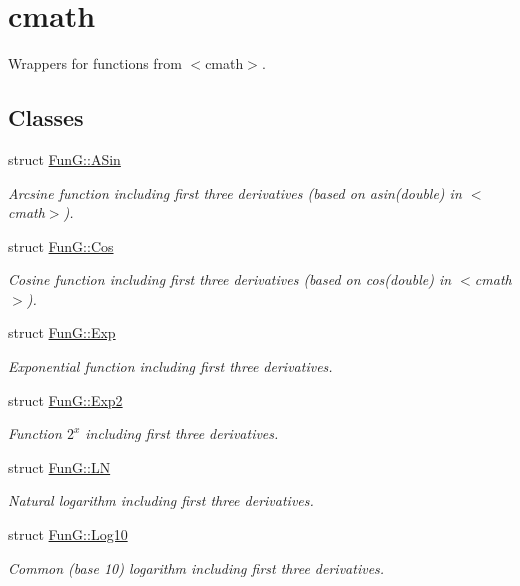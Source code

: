 \hypertarget{group__CMathGroup}{\section{cmath}
\label{group__CMathGroup}
}


Wrappers for functions from $<$cmath$>$.  


\subsection*{Classes}
\begin{DoxyCompactItemize}
\item 
struct \hyperlink{structFunG_1_1ASin}{Fun\-G\-::\-A\-Sin}
\begin{DoxyCompactList}\small\item\em Arcsine function including first three derivatives (based on asin(double) in $<$cmath$>$). \end{DoxyCompactList}\item 
struct \hyperlink{structFunG_1_1Cos}{Fun\-G\-::\-Cos}
\begin{DoxyCompactList}\small\item\em Cosine function including first three derivatives (based on cos(double) in $<$cmath$>$). \end{DoxyCompactList}\item 
struct \hyperlink{structFunG_1_1Exp}{Fun\-G\-::\-Exp}
\begin{DoxyCompactList}\small\item\em Exponential function including first three derivatives. \end{DoxyCompactList}\item 
struct \hyperlink{structFunG_1_1Exp2}{Fun\-G\-::\-Exp2}
\begin{DoxyCompactList}\small\item\em Function $2^x$ including first three derivatives. \end{DoxyCompactList}\item 
struct \hyperlink{structFunG_1_1LN}{Fun\-G\-::\-L\-N}
\begin{DoxyCompactList}\small\item\em Natural logarithm including first three derivatives. \end{DoxyCompactList}\item 
struct \hyperlink{structFunG_1_1Log10}{Fun\-G\-::\-Log10}
\begin{DoxyCompactList}\small\item\em Common (base 10) logarithm including first three derivatives. \end{DoxyCompactList}\item 

\end{DoxyCompactItemize}
